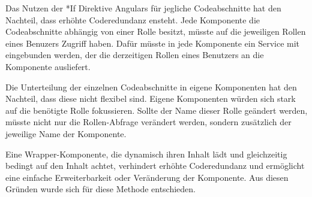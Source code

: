 Das Nutzen der *If Direktive Angulars für jegliche Codeabschnitte hat den Nachteil, dass erhöhte Coderedundanz ensteht. Jede Komponente die Codeabschnitte abhängig von einer Rolle besitzt, müsste auf die jeweiligen Rollen eines Benuzers Zugriff haben. Dafür müsste in jede Komponente ein Service mit eingebunden werden, der die derzeitigen Rollen eines Benutzers an die Komponente ausliefert.

Die Unterteilung der einzelnen Codeabschnitte in eigene Komponenten hat den Nachteil, dass diese nicht flexibel sind. Eigene Komponenten würden sich stark auf die benötigte Rolle fokussieren. Sollte der Name dieser Rolle geändert werden, müsste nicht nur die Rollen-Abfrage verändert werden, sondern zusätzlich der jeweilige Name der Komponente.

Eine Wrapper-Komponente, die dynamisch ihren Inhalt lädt und gleichzeitig bedingt auf den Inhalt achtet, verhindert erhöhte Coderedundanz und ermöglicht eine einfache Erweiterbarkeit oder Veränderung der Komponente. Aus diesen Gründen wurde sich für diese Methode entschieden.
